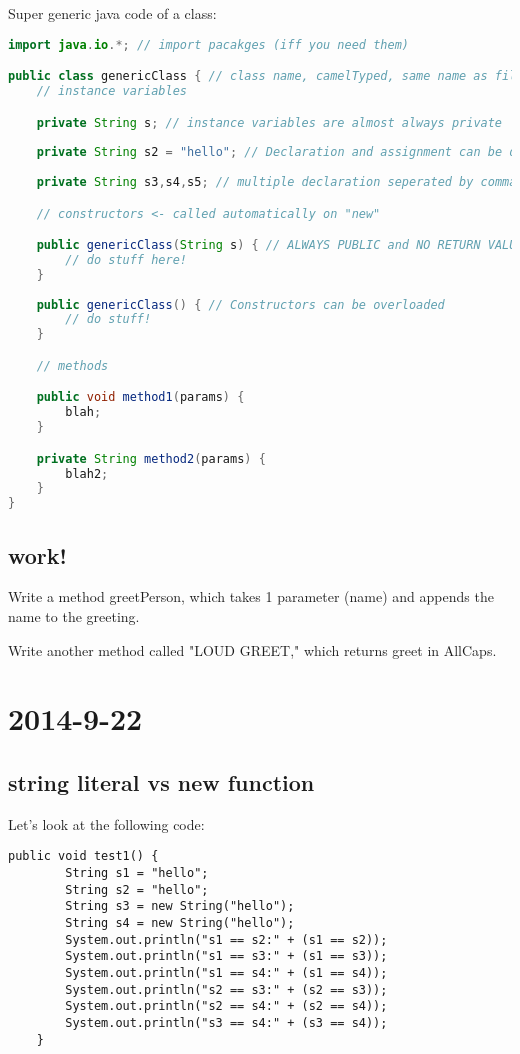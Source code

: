 \documentclass [12 pt, twoside] {article}
\begin{document}
Super generic java code of a class:
\begin{lstlisting}[language=Java]
import java.io.*; // import pacakges (iff you need them)

public class genericClass { // class name, camelTyped, same name as file
	// instance variables

	private String s; // instance variables are almost always private
	
	private String s2 = "hello"; // Declaration and assignment can be done at once
	
	private String s3,s4,s5; // multiple declaration seperated by commas

	// constructors <- called automatically on "new"

	public genericClass(String s) { // ALWAYS PUBLIC and NO RETURN VALUE
		// do stuff here!
	}
	
	public genericClass() { // Constructors can be overloaded
		// do stuff!
	}

	// methods

	public void method1(params) {
		blah;
	}

	private String method2(params) {
		blah2;
	}
}
\end{lstlisting}


\subsection{work!}


Write a method greetPerson, which takes 1 parameter (name) and appends the name to the greeting.


Write another method called "LOUD GREET," which returns greet in AllCaps.


\section{2014-9-22}
\subsection{string literal vs new function}


Let's look at the following code:
\begin{lstlisting}[languge = Java]
	public void test1() {
		String s1 = "hello";
		String s2 = "hello";
		String s3 = new String("hello");
		String s4 = new String("hello");
		System.out.println("s1 == s2:" + (s1 == s2));
		System.out.println("s1 == s3:" + (s1 == s3));
		System.out.println("s1 == s4:" + (s1 == s4));
		System.out.println("s2 == s3:" + (s2 == s3));
		System.out.println("s2 == s4:" + (s2 == s4));
		System.out.println("s3 == s4:" + (s3 == s4));
	}
\end{lstlisting}
\end{document}
